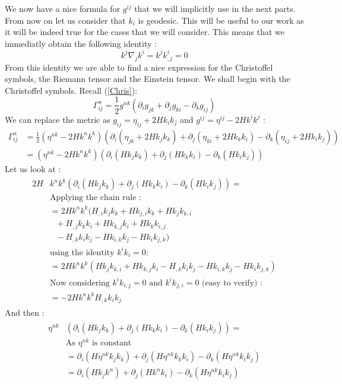 \documentclass[a4paper,12pt]{article}
\theoremstyle{definition}
\begin{document}
We now have a nice formula for $g^{ij}$ that we will implicitly use in the next parts.
From now on let us consider that $k_i$ is geodesic.
This will be useful to our work as it will be indeed true for the cases that we will consider.
This means that we immediatly obtain the following identity :
\begin{equation}
	k^j\nabla_jk^i=k^jk^i_{,j}=0
\end{equation}
From this identity we are able to find a nice expression for the Christoffel symbols, the Riemann tensor and the Einstein tensor.
We shall begin with the Christoffel symbols.
Recall (\ref{Chris}):
\begin{equation}
	\Gamma^n_{ij}=\frac{1}{2}g^{nk}(\partial_i g_{jk}+\partial_j g_{ki}-\partial_k g_{ij})
\end{equation}
We can replace the metric as $g_{ij}=\eta_{ij}+2Hk_ik_j$ and $g^{ij}=\eta^{ij}-2Hk^ik^j$ :
\begin{equation}
\begin{split}
	\Gamma^n_{ij}&=\frac{1}{2}(\eta^{nk}-2Hk^nk^k)(\partial_i (\eta_{jk}+2Hk_jk_k)+\partial_j (\eta_{ki}+2Hk_kk_i)-\partial_k (\eta_{ij}+2Hk_ik_j))\\
	&=(\eta^{nk}-2Hk^nk^k)(\partial_i (Hk_jk_k)+\partial_j (Hk_kk_i)-\partial_k (Hk_ik_j))
\end{split}
\end{equation}
Let us look at :
\begin{align}
\begin{split}
	2H&k^nk^k(\partial_i (Hk_jk_k)+\partial_j (Hk_kk_i)-\partial_k (Hk_ik_j)) =\\
	&\text{Applying the chain rule :}\\
	&=2Hk^nk^k(H_{,i}k_jk_k+Hk_{j,i}k_k+Hk_jk_{k,i}\\&\text{ }+H_{,j}k_kk_i+Hk_{k,j}k_i+Hk_kk_{i,j}\\&\text{ }-H_{,k}k_ik_j-Hk_{i,k}k_j-Hk_ik_{j,k})\\
	&\text{using the identity } k^ik_i=0 :\\
	&=2Hk^nk^k(Hk_jk_{k,i}+Hk_{k,j}k_i-H_{,k}k_ik_j-Hk_{i,k}k_j-Hk_ik_{j,k})\\
	&\text{Now considering $k^ik_{i,j}=0$ and $k^ik_{j,i}=0$ (easy to verify) :}\\
	&=-2Hk^nk^kH_{,k}k_ik_j
\end{split}
\end{align}
And then :
\begin{align}
\begin{split}
	\eta^{nk}&(\partial_i (Hk_jk_k)+\partial_j (Hk_kk_i)-\partial_k (Hk_ik_j))=\\
	&\text{As $\eta^{nk}$ is constant}\\
	&=\partial_i (H\eta^{nk}k_jk_k)+\partial_j (H\eta^{nk}k_kk_i)-\partial_k (H\eta^{nk}k_ik_j)\\
	&=\partial_i (Hk_jk^n)+\partial_j (Hk^nk_i)-\partial_k (H\eta^{nk}k_ik_j)
\end{split}
\end{align}
\end{document}
